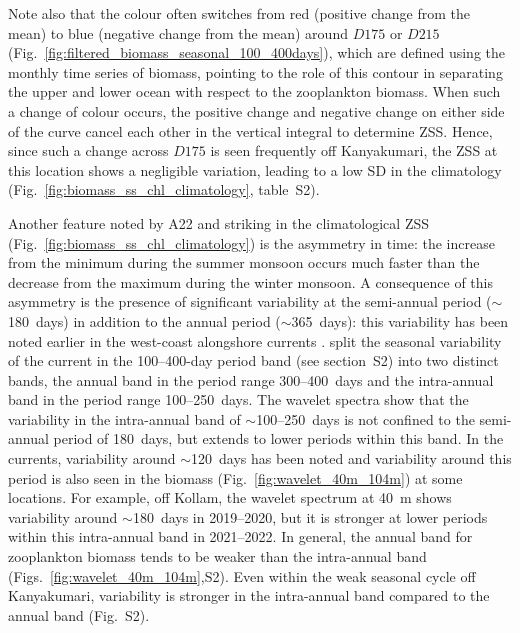 \documentclass[authoryear,review,11pt]{elsarticle}
\begin{document}
Note also that the colour often switches from red (positive change from the mean) to blue (negative change from the mean) around $D175$ or $D215$ (Fig.~\ref{fig:filtered_biomass_seasonal_100_400days}), which are defined using the monthly time series of biomass, pointing to the role of this contour in separating the upper and lower ocean with respect to the zooplankton biomass.  When such a change of colour occurs, the positive change and negative change on either side of the curve cancel each other in the vertical integral to determine ZSS.  Hence, since such a change across $D175$ is seen frequently off Kanyakumari, the ZSS at this location shows a negligible variation, leading to a low SD in the climatology (Fig.~\ref{fig:biomass_ss_chl_climatology}, table~S2).

Another feature noted by A22 and striking in the climatological ZSS (Fig.~\ref{fig:biomass_ss_chl_climatology}) is the asymmetry in time: the increase from the minimum during the summer monsoon occurs much faster than the decrease from the maximum during the winter monsoon.  A consequence of this asymmetry is the presence of significant variability at the semi-annual period ($\sim$180~days) in addition to the annual period ($\sim$365~days): this variability has been noted earlier in the west-coast alongshore currents \citep{amol2014observed, chaudhuri2020observed}.  \citet{amol2014observed} split the seasonal variability of the current in the 100--400-day period band (see section~S2) into two distinct bands, the annual band in the period range 300--400~days and the intra-annual band in the period range 100--250~days.  The wavelet spectra show that the variability in the intra-annual band of $\sim$100--250~days is not confined to the semi-annual period of 180~days, but extends to lower periods within this band.  In the currents, variability around $\sim$120~days has been noted \citep{amol2014observed, chaudhuri2020observed} and variability around this period is also seen in the biomass (Fig.~\ref{fig:wavelet_40m_104m}) at some locations.  For example, off Kollam, the wavelet spectrum at 40~m shows variability around $\sim$180~days in 2019--2020, but it is stronger at lower periods within this intra-annual band in 2021--2022.  In general, the annual band for zooplankton biomass tends to be weaker than the intra-annual band (Figs.~\ref{fig:wavelet_40m_104m},S2).  Even within the weak seasonal cycle off Kanyakumari, variability is stronger in the intra-annual band compared to the annual band (Fig.~S2).
\end{document}
